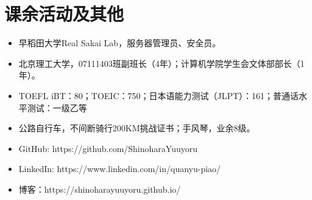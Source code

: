 \documentclass{resume}
\begin{document}
\section{课余活动及其他}
\begin{itemize}
  \item 早稻田大学Real Sakai Lab，服务器管理员、安全员。
  \item 北京理工大学，07111403班副班长（4年）；计算机学院学生会文体部部长（1年）。
  \item TOEFL iBT：80；TOEIC：750；日本语能力测试（JLPT）：161；普通话水平测试：一级乙等
  \item 公路自行车，不间断骑行200KM挑战证书；手风琴，业余8级。
  \item GitHub: https://github.com/ShinoharaYuuyoru
  \item LinkedIn: https://www.linkedin.com/in/quanyu-piao/
  \item 博客：https://shinoharayuuyoru.github.io/
\end{itemize}

%
%
\end{document}
